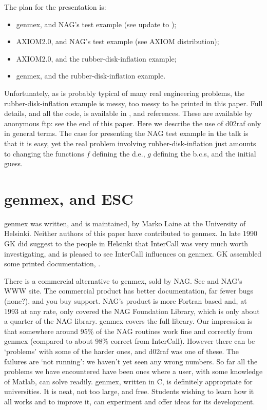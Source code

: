 The plan for the presentation is:
\begin{itemize}
\item{} genmex, and  NAG's test example (see update to \cite{KL});
\item{} AXIOM2.0, and NAG's test example (see AXIOM distribution);
\item{} AXIOM2.0, and the rubber-disk-inflation example;
\item{} genmex, and the rubber-disk-inflation example.
\end{itemize}
Unfortunately, as is probably typical of many real engineering
problems, the rubber-disk-inflation example is messy,
too messy to be printed in this paper.
Full details, and all the code, is available in \cite{H}, 
and references.
These are available by anonymous ftp:
see the end of this paper.
Here we describe the use of d02raf
only in general terms.
The case for presenting the NAG test example in the talk
is that it is easy, yet the real problem involving
rubber-disk-inflation just amounts to changing the
functions $f$ defining the d.e., $g$ defining the b.c.s,
and the initial guess.

\section*{genmex, and ESC}

genmex was written, and is maintained, by Marko Laine
at the University of Helsinki.
Neither authors of this paper have contributed to genmex. 
In late 1990 GK did suggest to the people in Helsinki that
InterCall was very much worth investigating, and is
pleased to see InterCall influences on genmex.
GK assembled some printed documentation, \cite{KL}.

There is a commercial alternative to genmex, sold by NAG.
See \cite{HHN} and NAG's WWW site.
The commercial product has better documentation,
far fewer bugs (none?), and you buy support.
NAG's product is more Fortran based and,
at 1993 at any rate, only covered the NAG Foundation Library,
which is only about a quarter of the NAG library.
genmex covers the full library.
Our impression is that somewhere around
95\% of the NAG routines work fine and
correctly from genmex
(compared to about 98\% correct from InterCall).
However there can be `problems' with some of the harder ones,
and d02raf was one of these.
The failures are `not running': we haven't yet seen any
wrong numbers.
So far all
the problems we have encountered have been ones where a user,
with some knowledge of Matlab, can solve readily.
genmex, written in C, is definitely appropriate for universities.
It is neat, not too large, and free.
Students wishing to learn how it all works
and to improve it, can experiment and offer ideas
for its development.
\goodbreak

